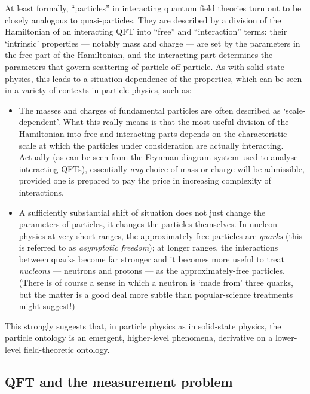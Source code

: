\documentclass[12pt]{article}
\begin{document}
At least formally, ``particles'' in interacting quantum field theories turn out to be closely analogous to quasi-particles. They are described by a division of the Hamiltonian of an interacting QFT into ``free'' and ``interaction'' terms: their `intrinsic' properties --- notably mass and charge --- are set by the parameters in the free part of the Hamiltonian, and the interacting part determines the parameters that govern scattering of particle off particle. As with solid-state physics, this leads to a situation-dependence of the properties, which can be seen in a variety of contexts in particle physics, such as:
\begin{itemize}
\item The masses and charges of fundamental particles are often described as `scale-dependent'. What this really means is that the most useful division of the Hamiltonian into free and interacting parts depends on the characteristic scale at which the particles under consideration are actually interacting. Actually (as can be seen from the Feynman-diagram system used to analyse interacting QFTs), essentially \emph{any} choice of mass or charge will be admissible, provided one is prepared to pay the price in increasing complexity of interactions.
\item A sufficiently substantial shift of situation does not just change the parameters of particles, it changes the particles themselves. In nucleon physics at very short ranges, the approximately-free particles are \emph{quarks} (this is referred to as \emph{asymptotic freedom}); at longer ranges, the interactions between quarks become far stronger and it becomes more useful to treat \emph{nucleons} --- neutrons and protons --- as the approximately-free particles. (There is of course a sense in which a neutron is `made from' three quarks, but the matter is a good deal more subtle than popular-science treatments might suggest!) 
\end{itemize}
This strongly suggests that, in particle physics as in solid-state physics, the particle ontology is an emergent, higher-level phenomena, derivative on a lower-level field-theoretic ontology. 



\subsection{QFT and the measurement problem}
\end{document}
